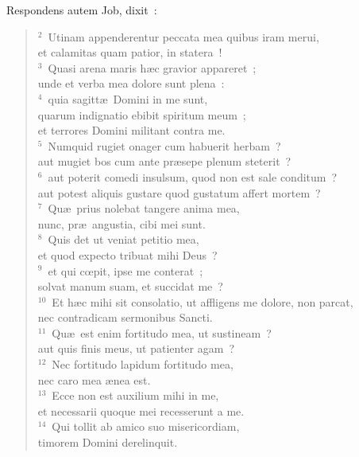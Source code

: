 \lettrine[lines=3,image=true,loversize=0.05,lraise=-0.03]{R}{}espondens autem Job, dixit~:
\begin{flushleft}\begin{verse}\vspace{6pt}${}^{2}$~Utinam appenderentur peccata mea quibus iram merui,\\ et calamitas quam patior, in statera~!\\
${}^{3}$~Quasi arena maris h\ae c gravior appareret~;\\ unde et verba mea dolore sunt plena~:\\
${}^{4}$~quia sagitt\ae\ Domini in me sunt,\\ quarum indignatio ebibit spiritum meum~;\\ et terrores Domini militant contra me.\\
${}^{5}$~Numquid rugiet onager cum habuerit herbam~?\\ aut mugiet bos cum ante pr\ae sepe plenum steterit~?\\
${}^{6}$~aut poterit comedi insulsum, quod non est sale conditum~?\\ aut potest aliquis gustare quod gustatum affert mortem~?\\
${}^{7}$~Qu\ae\ prius nolebat tangere anima mea,\\ nunc, pr\ae\ angustia, cibi mei sunt.\\
${}^{8}$~Quis det ut veniat petitio mea,\\ et quod expecto tribuat mihi Deus~?\\
${}^{9}$~et qui cœpit, ipse me conterat~;\\ solvat manum suam, et succidat me~?\\
${}^{10}$~Et h\ae c mihi sit consolatio, ut affligens me dolore, non parcat,\\ nec contradicam sermonibus Sancti.\\
${}^{11}$~Qu\ae\ est enim fortitudo mea, ut sustineam~?\\ aut quis finis meus, ut patienter agam~?\\
${}^{12}$~Nec fortitudo lapidum fortitudo mea,\\ nec caro mea \ae nea est.\\
${}^{13}$~Ecce non est auxilium mihi in me,\\ et necessarii quoque mei recesserunt a me.\\
${}^{14}$~Qui tollit ab amico suo misericordiam,\\ timorem Domini derelinquit.\\

\end{verse}
\end{flushleft}
